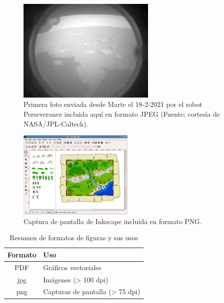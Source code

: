 \documentclass[11pt,a4paper]{article}
\begin{document}
\begin{figure}[hbt]
	\centering
	\includegraphics[width=0.6\textwidth]{Mars_Perseverance} 
	\caption[Foto histórica enviada desde Marte]{Primera foto enviada desde Marte el {18-2-2021} por el robot Perseverance incluida aquí en formato JPEG (Fuente: cortesía de NASA/JPL-Caltech).}
	\label{fig:mars}
\end{figure}

\begin{figure}[hbt]
	\centering
	\includegraphics[width=0.5\textwidth]{inkscape} 
	\caption[Ejemplo de captura en png]{Captura de pantalla de \textsf{Inkscape} incluida en formato \textsf{PNG}.}
	\label{fig:inkscape}
\end{figure}


\begin{table}[hbt]
\centering
\caption{Resumen de formatos de figuras y sus usos}\label{tab:formatos}
\begin{tabular}{c|l}
\textbf{Formato} & \textbf{Uso} \\
\hline
PDF & Gráficos vectoriales \\
jpg & Imágenes (> 100 dpi) \\
png & Capturas de pantalla (> 75 dpi) 
\end{tabular}
\end{table}
\end{document}
